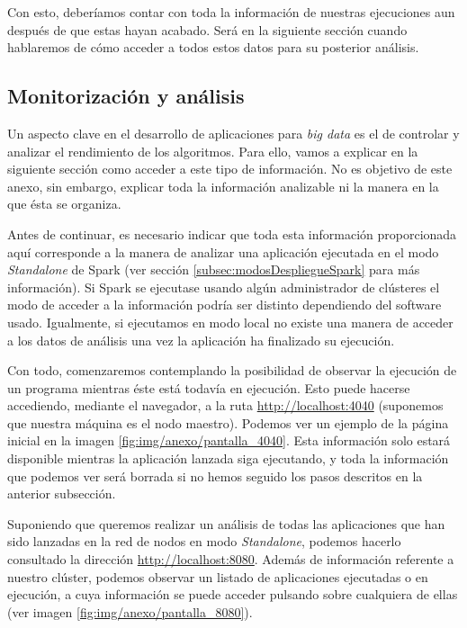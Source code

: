 Con esto, deberíamos contar con toda la información de nuestras ejecuciones aun después de que estas hayan acabado. Será en la siguiente sección cuando hablaremos de cómo acceder a todos estos datos para su posterior análisis.


\subsection{Monitorización y análisis}\label{subsec:monitorizacion}

Un aspecto clave en el desarrollo de aplicaciones para \textit{big data} es el de controlar y analizar el rendimiento de los algoritmos. Para ello, vamos a explicar en la siguiente sección como acceder a este tipo de información. No es objetivo de este anexo, sin embargo, explicar toda la información analizable ni la manera en la que ésta se organiza.

Antes de continuar, es necesario indicar que toda esta información proporcionada aquí corresponde a la manera de analizar una aplicación ejecutada en el modo \textit{Standalone} de Spark (ver sección \ref{subsec:modosDespliegueSpark} para más información). Si Spark se ejecutase usando algún administrador de clústeres el modo de acceder a la información podría ser distinto dependiendo del software usado. Igualmente, si ejecutamos en modo local no existe una manera de acceder a los datos de análisis una vez la aplicación ha finalizado su ejecución.

Con todo, comenzaremos contemplando la posibilidad de observar la ejecución de un programa mientras éste está todavía en ejecución. Esto puede hacerse accediendo, mediante el navegador, a la ruta \url{http://localhost:4040} (suponemos que nuestra máquina es el nodo maestro). Podemos ver un ejemplo de la página inicial en la imagen \ref{fig:img/anexo/pantalla_4040}. Esta información solo estará disponible mientras la aplicación lanzada siga ejecutando, y toda la información que podemos ver será borrada si no hemos seguido los pasos descritos en la anterior subsección.


Suponiendo que queremos realizar un análisis de todas las aplicaciones que han sido lanzadas en la red de nodos en modo \textit{Standalone}, podemos hacerlo consultado la dirección \url{http://localhost:8080}. Además de información referente a nuestro clúster, podemos observar un listado de aplicaciones ejecutadas o en ejecución, a cuya información se puede acceder pulsando sobre cualquiera de ellas (ver imagen \ref{fig:img/anexo/pantalla_8080}).

